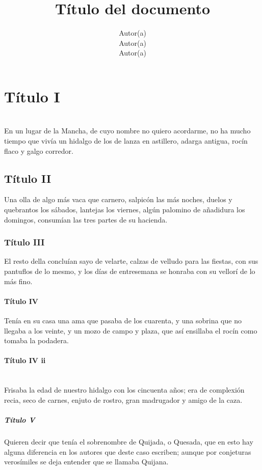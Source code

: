 \documentclass[stu, 12pt, letterpaper, donotrepeattitle, floatsintext, natbib]{apa7}
\title{\Large Título del documento}
\author{Autor(a) \\Autor(a) \\Autor(a)} %
\affiliation{Nombre de la institución}
\newcommand{\myparagraph}[1]{\paragraph{#1}\mbox{}\\}
\begin{document}
    \maketitle


    \renewcommand\contentsname{\largeÍndice}
    \tableofcontents
    \setcounter{tocdepth}{2}
    \newpage
    \renewcommand{\listfigurename}{\largeÍndice de fíguras}
    \listoffigures
    \newpage
    \renewcommand{\listtablename}{\largeÍndice de tablas}
    \listoftables
    \newpage



    \section{\large Título I}
    \noindent {}\\
    En un lugar de la Mancha, de cuyo nombre no quiero acordarme, no ha mucho tiempo que vivía un hidalgo de los de lanza en astillero, adarga antigua, rocín flaco y galgo corredor.

    \subsection{Título II}
    Una olla de algo más vaca que carnero, salpicón las más noches, duelos y quebrantos los sábados, lantejas los viernes, algún palomino de añadidura los domingos, consumían las tres partes de su hacienda.

    \subsubsection{Título III}
    El resto della concluían sayo de velarte, calzas de velludo para las fiestas, con sus pantuflos de lo mesmo, y los días de entresemana se honraba con su vellorí de lo más fino.

    \paragraph{Título IV}
    Tenía en su casa una ama que pasaba de los cuarenta, y una sobrina que no llegaba a los veinte, y un mozo de campo y plaza, que así ensillaba el rocín como tomaba la podadera.
    \myparagraph{Título IV ii}
    Frisaba la edad de nuestro hidalgo con los cincuenta años; era de complexión recia, seco de carnes, enjuto de rostro, gran madrugador y amigo de la caza.

    \subparagraph{Título V}
    Quieren decir que tenía el sobrenombre de Quijada, o Quesada, que en esto hay alguna diferencia en los autores que deste caso escriben; aunque por conjeturas verosímiles se deja entender que se llamaba Quijana.

    \newpage
    \renewcommand\refname{\large\textbf{Referencias}}
    
\end{document}
